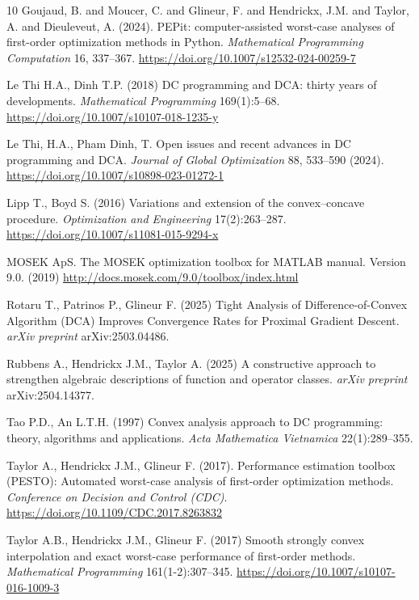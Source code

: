 \documentclass{article} %
\begin{document}
\begin{thebibliography}{10}
 Goujaud, B. and Moucer, C. and Glineur, F. and Hendrickx, J.M. and Taylor, A. and Dieuleveut, A. (2024). PEPit: computer-assisted worst-case analyses of first-order optimization methods in Python.  \textit{Mathematical Programming Computation} 16, 337–367. \url{https://doi.org/10.1007/s12532-024-00259-7}

 Le Thi H.A., Dinh T.P. (2018) {D}{C} programming and {D}{C}{A}: thirty years of developments. \textit{Mathematical Programming} 169(1):5--68. \url{https://doi.org/10.1007/s10107-018-1235-y}

Le Thi, H.A., Pham Dinh, T. Open issues and recent advances in DC programming
and DCA. \textit{Journal of Global Optimization} 88, 533--590 (2024). \url{https://doi.org/10.1007/s10898-023-01272-1}

 Lipp T., Boyd S. (2016) Variations and extension of the convex--concave procedure. \textit{Optimization and Engineering} 17(2):263--287. \url{https://doi.org/10.1007/s11081-015-9294-x}

MOSEK ApS. The MOSEK optimization toolbox for MATLAB manual. Version 9.0. (2019)
   \url{http://docs.mosek.com/9.0/toolbox/index.html}

 Rotaru T., Patrinos P., Glineur F. (2025) Tight
Analysis of Difference-of-Convex Algorithm (DCA) Improves Convergence Rates for Proximal Gradient Descent. \textit{arXiv preprint} arXiv:2503.04486.

 Rubbens A., Hendrickx J.M., Taylor A. (2025) A constructive approach to strengthen algebraic descriptions of function and operator classes. \textit{arXiv preprint} arXiv:2504.14377.

 Tao P.D., An L.T.H. (1997) Convex analysis approach to {D}{C} programming: theory, algorithms and applications. \textit{Acta Mathematica Vietnamica} 22(1):289--355.	


 Taylor A., Hendrickx J.M., Glineur F. (2017). Performance estimation toolbox (PESTO): Automated worst-case analysis of first-order optimization methods. \textit{Conference on Decision and Control (CDC)}. \url{https://doi.org/10.1109/CDC.2017.8263832}

 Taylor A.B., Hendrickx J.M., Glineur F. (2017) Smooth strongly
 convex interpolation and exact worst-case performance of first-order methods. \textit{Mathematical Programming} 161(1-2):307--345. \url{https://doi.org/10.1007/s10107-016-1009-3}


\end{thebibliography}
\end{document}
